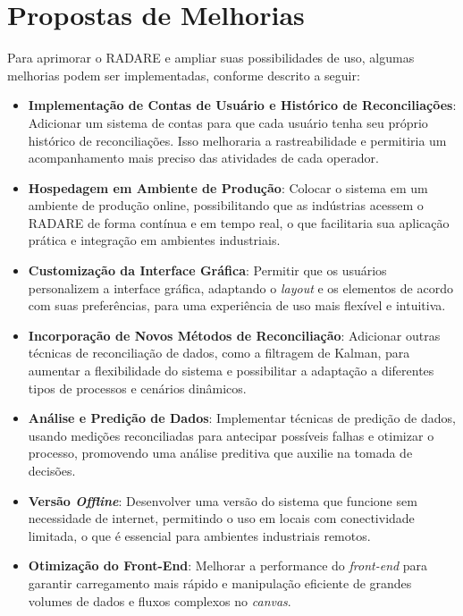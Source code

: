 \section{Propostas de Melhorias}

Para aprimorar o RADARE e ampliar suas possibilidades de uso, algumas melhorias podem ser implementadas, conforme descrito a seguir:

\begin{itemize}
    \item \textbf{Implementação de Contas de Usuário e Histórico de Reconciliações}: Adicionar um sistema de contas para que cada usuário tenha seu próprio histórico de reconciliações. Isso melhoraria a rastreabilidade e permitiria um acompanhamento mais preciso das atividades de cada operador.

    \item \textbf{Hospedagem em Ambiente de Produção}: Colocar o sistema em um ambiente de produção online, possibilitando que as indústrias acessem o RADARE de forma contínua e em tempo real, o que facilitaria sua aplicação prática e integração em ambientes industriais.

    \item \textbf{Customização da Interface Gráfica}: Permitir que os usuários personalizem a interface gráfica, adaptando o \textit{layout} e os elementos de acordo com suas preferências, para uma experiência de uso mais flexível e intuitiva.

    \item \textbf{Incorporação de Novos Métodos de Reconciliação}: Adicionar outras técnicas de reconciliação de dados, como a filtragem de Kalman, para aumentar a flexibilidade do sistema e possibilitar a adaptação a diferentes tipos de processos e cenários dinâmicos.

    \item \textbf{Análise e Predição de Dados}: Implementar técnicas de predição de dados, usando medições reconciliadas para antecipar possíveis falhas e otimizar o processo, promovendo uma análise preditiva que auxilie na tomada de decisões.

    \item \textbf{Versão \textit{Offline}}: Desenvolver uma versão do sistema que funcione sem necessidade de internet, permitindo o uso em locais com conectividade limitada, o que é essencial para ambientes industriais remotos.

    \item \textbf{Otimização do Front-End}: Melhorar a performance do \textit{front-end} para garantir carregamento mais rápido e manipulação eficiente de grandes volumes de dados e fluxos complexos no \textit{canvas}.
\end{itemize}

